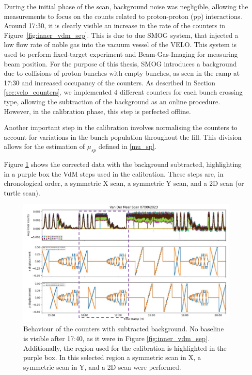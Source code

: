 During the initial phase of the scan, background noise was negligible, allowing the measurements to focus on the counts related to proton-proton (pp) interactions. Around 17:30, it is clearly visible an increase in the rate of the counters in Figure~\ref{fig:inner_vdm_sep}. This is due to due SMOG system\cite{CERN-LHCC-2019-005}, that injected a low flow rate of noble gas into the vacuum vessel of the VELO. This system is used to perform fixed-target experiment and Beam-Gas-Imaging for measuring beam position\cite{Coombs:2767576}. For the purpose of this thesis, SMOG introduces a background due to collisions of proton bunches with empty bunches, as seen in the ramp at 17:30 and increased occupancy of the counters.  As described in Section \ref{sec:velo_counters}, we implemented 4 different counters for each bunch crossing type, allowing the subtraction of the background as an online procedure. However, in the calibration phase, this step is perfected offline. 

Another important step in the calibration involves normalising the counters to account for variations in the bunch population throughout the fill. This division allows for the estimation of $\mu_{sp}$ defined in \eqref{mu_sp}. 

Figure \ref{fig:bkg_sub_calib} shows the corrected data with the background subtracted, highlighting in a purple box the VdM steps used in the calibration. These steps are, in chronological order, a symmetric X scan, a symmetric Y scan, and a 2D scan (or turtle scan). 

\begin{figure}
    \centering
    \includegraphics[width=\textwidth]{figures/calibration_period.png}
    \caption{Behaviour of the counters with subtracted background. No baseline is visible after 17:40, as it were in Figure \ref{fig:inner_vdm_sep}. Additionally, the region used for the calibration is highlighted in the purple box. In this selected region a symmetric scan in X, a symmetric scan in Y, and a 2D scan were performed.}
    \label{fig:bkg_sub_calib}
\end{figure}

